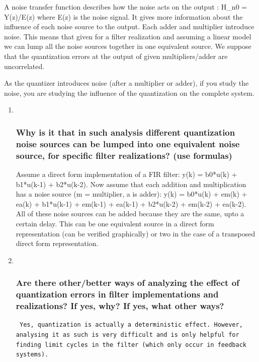 \documentclass[
  a4paper,
  ,captions=tableheading
]{scrartcl}
\begin{document}
A noise transfer function describes how the noise acts on the output :
H\_n0 = Y(z)/E(z) where E(z) is the noise signal. It gives more
information about the influence of each noise source to the output. Each
adder and multiplier introduce noise. This means that given for a filter
realization and assuming a linear model we can lump all the noise
sources together in one equivalent source. We suppose that the
quantization errors at the output of given multipliers/adder are
uncorrelated.

As the quantizer introduces noise (after a multiplier or adder), if you
study the noise, you are studying the influence of the quantization on
the complete system.

\begin{enumerate}
\def\labelenumi{\arabic{enumi}.}
\setcounter{enumi}{1}
\item ~
  \subsubsection{Why is it that in such analysis different quantization
  noise sources can be lumped into one equivalent noise source, for
  specific filter realizations? (use
  formulas)}\label{why-is-it-that-in-such-analysis-different-quantization-noise-sources-can-be-lumped-into-one-equivalent-noise-source-for-specific-filter-realizations-use-formulas}

  Assume a direct form implementation of a FIR filter: y(k) = b0*u(k) +
  b1*u(k-1) + b2*u(k-2). Now assume that each addition and
  multiplication has a noise source (m = multiplier, a is adder): y(k) =
  b0*u(k) + em(k) + ea(k) + b1*u(k-1) + em(k-1) + ea(k-1) + b2*u(k-2) +
  em(k-2) + ea(k-2). All of these noise sources can be added because
  they are the same, upto a certain delay. This can be one equivalent
  source in a direct form representation (can be verified graphically)
  or two in the case of a transposed direct form representation.
\item ~
  \subsubsection{Are there other/better ways of analyzing the effect of
  quantization errors in filter implementations and realizations? If
  yes, why? If yes, what other
  ways?}\label{are-there-otherbetter-ways-of-analyzing-the-effect-of-quantization-errors-in-filter-implementations-and-realizations-if-yes-why-if-yes-what-other-ways}

\begin{lstlisting}
 Yes, quantization is actually a deterministic effect. However, analysing it as such is very difficult and is only helpful for finding limit cycles in the filter (which only occur in feedback systems).  
\end{lstlisting}
\end{enumerate}
\end{document}
